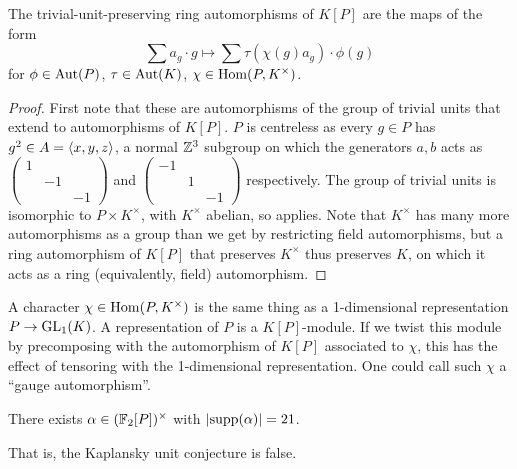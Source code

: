 \begin{corollary}
    The trivial-unit-preserving ring automorphisms of $K[P]$ are the maps of the form \[
        \sum a_g \cdot g \mapsto \sum \tau(\chi(g) a_g) \cdot \phi(g)
    \] for $\phi \in \mathrm{Aut}(P)$, $\tau \in \mathrm{Aut}(K)$, $\chi \in \mathrm{Hom}(P, K^\times)$.
\end{corollary}

\begin{proof}
    First note that these are automorphisms of the group of trivial units that extend to automorphisms of $K[P]$.
    $P$ is centreless as every $g \in P$ has $g^2 \in A = \langle x, y, z \rangle$, a normal $\mathbb{Z}^3$ subgroup on which the generators $a, b$ acts as $\left(\begin{smallmatrix} 1 & & \\ & -1 & \\ & & -1 \end{smallmatrix}\right)$ and $\left(\begin{smallmatrix} -1 & & \\ & 1 & \\ & & -1 \end{smallmatrix}\right)$ respectively.
    The group of trivial units is isomorphic to $P \times K^\times$, with $K^\times$ abelian, so  applies.
    Note that $K^\times$ has many more automorphisms as a group than we get by restricting field automorphisms, but a ring automorphism of $K[P]$ that preserves $K^\times$ thus preserves $K$, on which it acts as a ring (equivalently, field) automorphism.
\end{proof}

\begin{remark}
    A character $\chi \in \mathrm{Hom}(P, K^\times)$ is the same thing as a 1-dimensional representation $P \to \mathrm{GL}_1(K)$.
    A representation of $P$ is a $K[P]$-module.
    If we twist this module by precomposing with the automorphism of $K[P]$ associated to $\chi$, this has the effect of tensoring with the 1-dimensional representation.
    One could call such $\chi$ a ``gauge automorphism''.
\end{remark}

\begin{theorem}
    \label{theorem:promislow_unit}
    There exists $\alpha \in (\mathbb{F}_2[P])^\times$ with $\lvert \operatorname{supp}(\alpha) \rvert = 21$.
\end{theorem}

That is, the Kaplansky unit conjecture is false.


